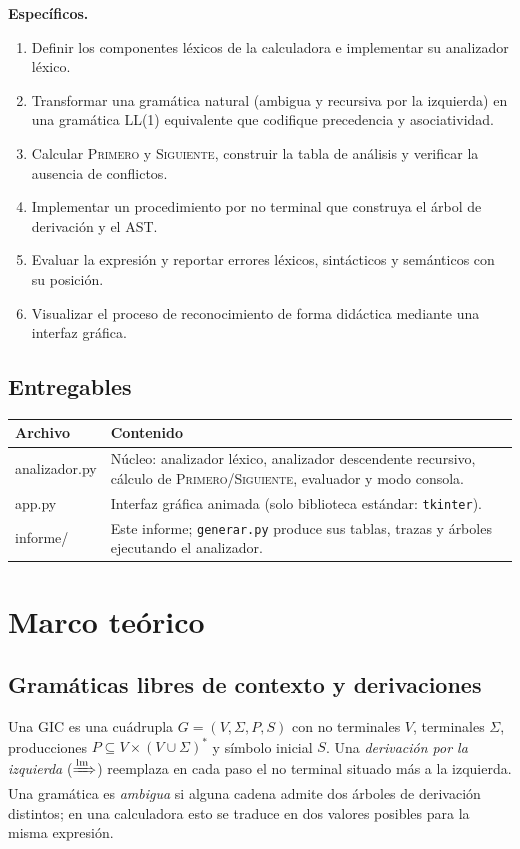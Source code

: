 \documentclass[11pt,a4paper]{article}
\newcommand{\PRIMERO}{\textsc{Primero}}
\newcommand{\SIGUIENTE}{\textsc{Siguiente}}
\begin{document}
\textbf{Específicos.}
\begin{enumerate}[label=\textcolor{acento}{\sffamily\bfseries\arabic*.}]
  \item Definir los componentes léxicos de la calculadora e implementar su analizador léxico.
  \item Transformar una gramática natural (ambigua y recursiva por la izquierda) en una gramática
        \textsc{LL(1)} equivalente que codifique precedencia y asociatividad.
  \item Calcular \PRIMERO{} y \SIGUIENTE{}, construir la tabla de análisis y verificar la ausencia de conflictos.
  \item Implementar un procedimiento por no terminal que construya el árbol de derivación y el AST.
  \item Evaluar la expresión y reportar errores léxicos, sintácticos y semánticos con su posición.
  \item Visualizar el proceso de reconocimiento de forma didáctica mediante una interfaz gráfica.
\end{enumerate}

\subsection{Entregables}
\begin{center}
\begin{tabular}{>{\ttfamily\small}l L{10.2cm}}
\toprule
\rmfamily\bfseries Archivo & \textbf{Contenido} \\
\midrule
analizador.py & Núcleo: analizador léxico, analizador descendente recursivo, cálculo de \PRIMERO/\SIGUIENTE, evaluador y modo consola. \\
app.py        & Interfaz gráfica animada (solo biblioteca estándar: \texttt{tkinter}). \\
informe/      & Este informe; \texttt{generar.py} produce sus tablas, trazas y árboles ejecutando el analizador. \\
\bottomrule
\end{tabular}
\end{center}

\section{Marco teórico}

\subsection{Gramáticas libres de contexto y derivaciones}
Una GIC es una cuádrupla $G=(V,\Sigma,P,S)$ con no terminales $V$, terminales $\Sigma$, producciones
$P\subseteq V\times(V\cup\Sigma)^*$ y símbolo inicial $S$. Una \emph{derivación por la izquierda}
($\xRightarrow{\text{lm}}$) reemplaza en cada paso el no terminal situado más a la izquierda. Una
gramática es \emph{ambigua} si alguna cadena admite dos árboles de derivación distintos; en una
calculadora esto se traduce en dos valores posibles para la misma expresión.
\end{document}
